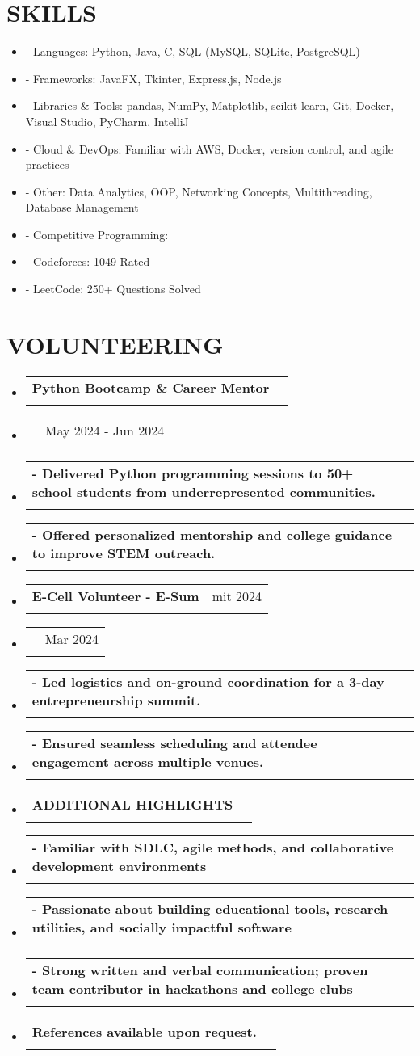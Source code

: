 \documentclass[letterpaper,11pt]{article}
\makeatletter
\newcommand{\resumeSubheading}[4]{
  \item
    \begin{tabular*}{0.97\textwidth}[t]{l@{\extracolsep{\fill}}r}
      \textbf{#1} & #2 \\
      \textit{\small#3} & \textit{\small#4} \\
    \end{tabular*}\vspace{-5pt}
}
\newcommand{\resumeSubHeadingListStart}{\begin{itemize}[leftmargin=0.15in, label={}]}
\newcommand{\resumeSubHeadingListEnd}{\end{itemize}}
\makeatother
\begin{document}
\section{SKILLS}
\begin{itemize}[leftmargin=0.15in, label={}]
\item - Languages: Python, Java, C, SQL (MySQL, SQLite, PostgreSQL)
\item - Frameworks: JavaFX, Tkinter, Express.js, Node.js
\item - Libraries \& Tools: pandas, NumPy, Matplotlib, scikit-learn, Git, Docker, Visual Studio, PyCharm, IntelliJ
\item - Cloud \& DevOps: Familiar with AWS, Docker, version control, and agile practices
\item - Other: Data Analytics, OOP, Networking Concepts, Multithreading, Database Management
\item - Competitive Programming: 
\item - Codeforces: 1049 Rated
\item - LeetCode: 250+ Questions Solved
\end{itemize}

\section{VOLUNTEERING}
\resumeSubHeadingListStart
\resumeSubheading{Python Bootcamp \& Career Mentor}{}{}{}
\resumeSubheading{}{May 2024 - Jun 2024}{}{}
\resumeSubheading{- Delivered Python programming sessions to 50+ school students from underrepresented communities.}{}{}{}
\resumeSubheading{- Offered personalized mentorship and college guidance to improve STEM outreach.}{}{}{}
\resumeSubheading{E-Cell Volunteer - E-Sum}{mit 2024}{}{}
\resumeSubheading{}{Mar 2024}{}{}
\resumeSubheading{- Led logistics and on-ground coordination for a 3-day entrepreneurship summit.}{}{}{}
\resumeSubheading{- Ensured seamless scheduling and attendee engagement across multiple venues.}{}{}{}
\resumeSubheading{ADDITIONAL HIGHLIGHTS}{}{}{}
\resumeSubheading{- Familiar with SDLC, agile methods, and collaborative development environments}{}{}{}
\resumeSubheading{- Passionate about building educational tools, research utilities, and socially impactful software}{}{}{}
\resumeSubheading{- Strong written and verbal communication; proven team contributor in hackathons and college clubs}{}{}{}
\resumeSubheading{References available upon request.}{}{}{}
\resumeSubHeadingListEnd
\end{document}
